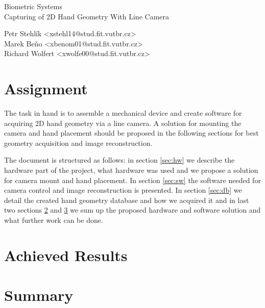 \documentclass[11pt,a4paper]{article}
\begin{document}
\begin{center}
	\LARGE{Biometric Systems}\\
	\Large{Capturing of 2D Hand Geometry With Line Camera}
	\vspace{0.5cm}

    \begin{centering}
    \small{
        Petr Stehlík <xstehl14@stud.fit.vutbr.cz>\\
        Marek Beňo <xbenom01@stud.fit.vutbr.cz>\\
        Richard Wolfert <xwolfe00@stud.fit.vutbr.cz>\\
        }
    \end{centering}

	\vspace{0.2cm}

\end{center}

\section{Assignment}
The task in hand is to assemble a mechanical device and create software for acquiring 2D hand geometry via a line camera. A solution for mounting the camera and hand placement should be proposed in the following sections for best geometry acquisition and image reconstruction.

The document is structured as follows: in section \ref{sec:hw} we describe the hardware part of the project, what hardware was used and we propose a solution for camera mount and hand placement. In section \ref{sec:sw} the software needed for camera control and image reconstruction is presented. In section \ref{sec:db} we detail the created hand geometry database and how we acquired it and in last two sections \ref{sec:res} and \ref{sec:sum} we sum up the proposed hardware and software solution and what further work can be done.








\section{Achieved Results}
\label{sec:res}

\section{Summary}
\label{sec:sum}
\end{document}
